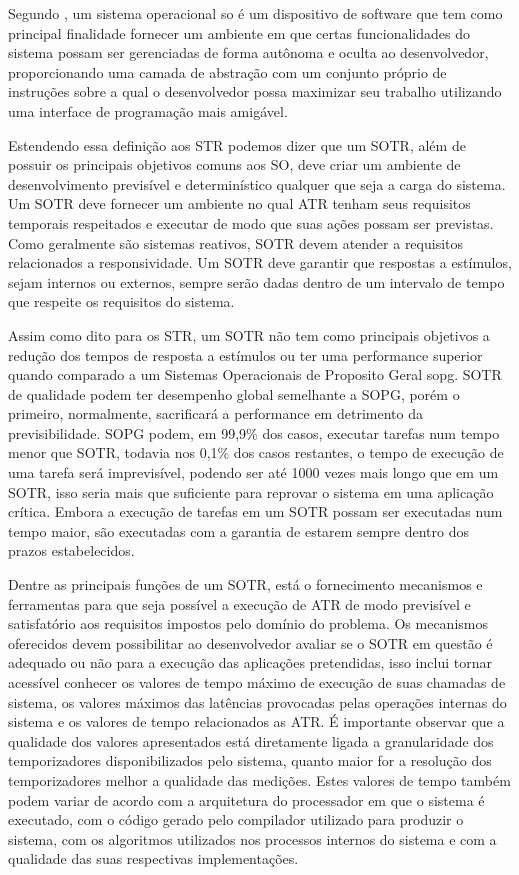 Segundo \cite{Tanenbaum2009}, um sistema operacional \gls{so} é um dispositivo de software que tem como principal finalidade fornecer um ambiente em que certas funcionalidades do sistema possam ser gerenciadas de forma autônoma e oculta ao desenvolvedor, proporcionando uma camada de abstração com um conjunto próprio de instruções sobre a qual o desenvolvedor possa maximizar seu trabalho utilizando uma interface de programação mais amigável.

Estendendo essa definição aos STR podemos dizer que um SOTR, além de possuir os principais objetivos comuns aos SO, deve criar um ambiente de desenvolvimento previsível e determinístico qualquer que seja a carga do sistema. Um SOTR deve fornecer um ambiente no qual ATR tenham seus requisitos temporais respeitados e executar de modo que suas ações possam ser previstas. Como geralmente são sistemas reativos, SOTR devem atender a requisitos relacionados a responsividade. Um SOTR deve garantir que respostas a estímulos, sejam internos ou externos, sempre serão dadas dentro de um intervalo de tempo que respeite os requisitos do sistema.

Assim como dito para os STR, um SOTR não tem como principais objetivos a redução dos tempos de resposta a estímulos ou ter uma performance superior quando comparado a um Sistemas Operacionais de Proposito Geral \gls{sopg}. SOTR de qualidade podem ter desempenho global semelhante a SOPG, porém o primeiro, normalmente, sacrificará a performance em detrimento da previsibilidade. SOPG podem, em 99,9\% dos casos, executar tarefas num tempo menor que SOTR, todavia nos 0,1\% dos casos restantes, o tempo de execução de uma tarefa será imprevisível, podendo ser até 1000 vezes mais longo que em um SOTR, isso seria mais que suficiente para reprovar o sistema em uma aplicação crítica. Embora a execução de tarefas em um SOTR possam ser executadas num tempo maior, são executadas com a garantia de estarem sempre dentro dos  prazos estabelecidos.

Dentre as principais funções de um SOTR, está o fornecimento mecanismos e ferramentas para que seja possível a execução de ATR de modo previsível e satisfatório aos requisitos impostos pelo domínio do problema. Os mecanismos oferecidos devem possibilitar ao desenvolvedor avaliar se o SOTR em questão é adequado ou não para a execução das aplicações pretendidas, isso inclui tornar acessível conhecer os valores de tempo máximo de execução de suas chamadas de sistema, os valores máximos das latências provocadas pelas operações internas do sistema e os valores de tempo relacionados as ATR. É importante observar que a qualidade dos valores apresentados está diretamente ligada a granularidade dos temporizadores disponibilizados pelo sistema, quanto maior for a resolução dos temporizadores melhor a qualidade das medições. Estes valores de tempo também podem variar de acordo com a arquitetura do processador em que o sistema é executado, com o código gerado pelo compilador utilizado para produzir o sistema, com os algoritmos utilizados nos processos internos do sistema e com a qualidade das suas respectivas implementações.

